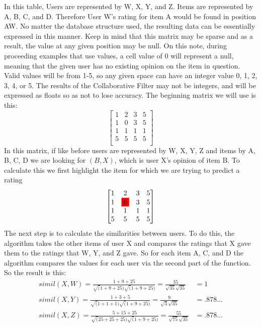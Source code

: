 \documentclass[12pt]{article}
\begin{document}
  \indent In this table, Users are represented by W, X, Y, and Z.  Items are represented by A, B, C, and D.  Therefore User W's rating for item A would be found in position AW.  No matter the database structure used, the resulting data can be essentially expressed in this manner.  Keep in mind that this matrix may be sparse and as a result, the value at any given position may be null.
  \p On this note, during proceeding examples that use values, a cell value of 0 will represent a null, meaning that the given user has no existing opinion on the item in question.  Valid values will be from 1-5, so any given space can have an integer value 0, 1, 2, 3, 4, or 5.  The results of the Collaborative Filter may not be integers, and will be expressed as floats so as not to lose accuracy.
  \p The beginning matrix we will use is this:
  \begin{displaymath}
    \begin{bmatrix}
      1 & 2 & 3 & 5 \\
      1 & 0 & 3 & 5 \\
      1 & 1 & 1 & 1 \\
      5 & 5 & 5 & 5 \\
    \end{bmatrix}
  \end{displaymath}
  \p In this matrix, if like before users are represented by W, X, Y, Z and items by A, B, C, D we are looking for $(B, X)$, which is user X's opinion of item B.  To calculate this we first highlight the item for which we are trying to predict a rating
  \begin{displaymath}
      \begin{bmatrix}
        1 & 2 & 3 & 5 \\
        1 & \colorbox{red}{0} & 3 & 5 \\
        1 & 1 & 1 & 1 \\
        5 & 5 & 5 & 5 \\
      \end{bmatrix}
    \end{displaymath}
  \p The next step is to calculate the similarities between users.  To do this, the algorithm takes the other items of user X and compares the ratings that X gave them to the ratings that W, Y, and Z gave.  So for each item A, C, and D the algorithm compares the values for each user via the second part of the \similarity function.  So the result is this:
  \begin{align}
    simil(X, W) = \frac{1+9+25}{\sqrt(1+9+25)\sqrt(1+9+25)} = \frac{35}{\sqrt{35}\sqrt{35}} &= 1 \\
    simil(X, Y) = \frac{1+3+5}{\sqrt(1+1+1)\sqrt(1+9+25)} = \frac{9}{\sqrt{3}\sqrt{35}} &= .878... \\
    simil(X, Z) = \frac{5+15+25}{\sqrt(25+25+25)\sqrt(1+9+25)} = \frac{55}{\sqrt{75}\sqrt{35}} &= .878...
  \end{align}
\end{document}
